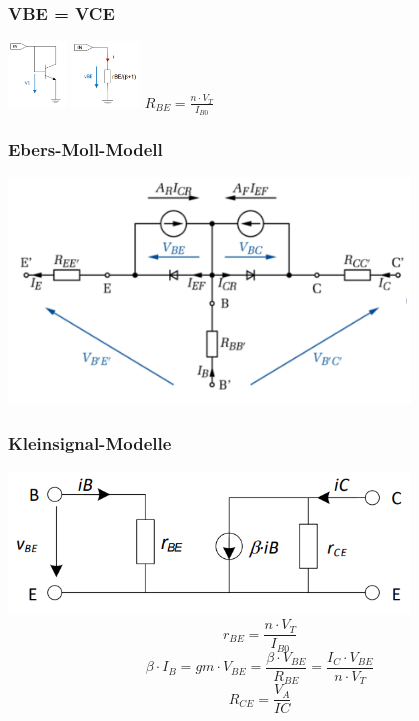 \documentclass[margin=normal]{tex/hsrzf}
\begin{document}
\begin{minipage}{0.49\textwidth}
  \subsubsection*{VBE = VCE}
  \includegraphics[height = 50pt]{img/Transistor/VBEgleichVCETransistor.png}
  \includegraphics[height = 50pt]{img/Transistor/VBEgleichVCEErsatz.png}
  $R_{BE} = \frac{n \cdot V_T}{I_{B0}}$
  \subsubsection*{Ebers-Moll-Modell}
  \includegraphics[width = 0.8\textwidth]{img/Transistor/EbersMollModell.png}
\end{minipage}%
\begin{minipage}{0.49\textwidth}
  \subsubsection*{Kleinsignal-Modelle}
  \includegraphics[width = 0.8\textwidth]{img/Transistor/KleinsignalModell.png}
  $$r_{BE} = \frac{n \cdot V_T}{I_{B0}}$$
  $$\beta \cdot I_B = gm \cdot V_{BE} = \frac{\beta \cdot V_{BE}}{R_{BE}} = \frac{I_C\cdot V_{BE}}{n \cdot V_T}$$
  $$R_{CE} = \frac{V_A}{IC}$$
\end{minipage}%
\end{document}
